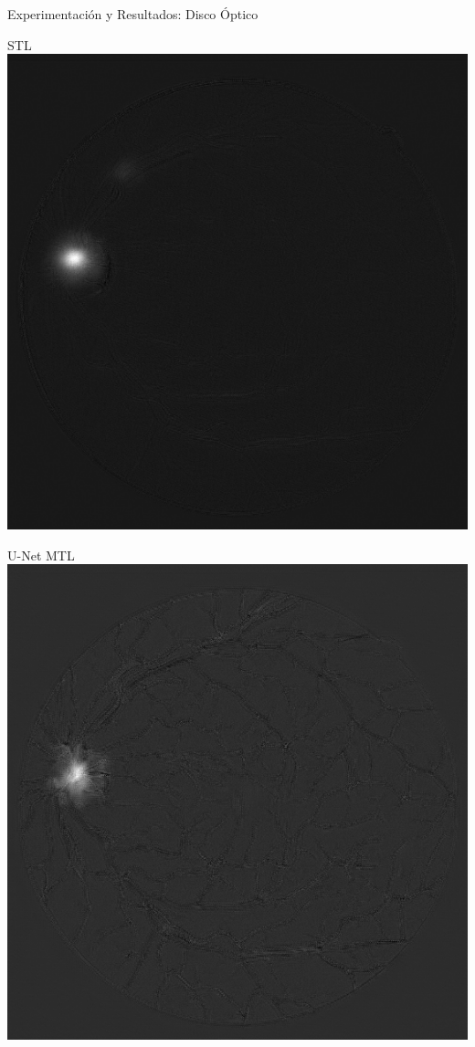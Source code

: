 \documentclass[xcolor=dvipsnames,table]{beamer}
\begin{document}
\begin{frame}{Experimentación y Resultados: Disco Óptico}
	\centering
	\begin{minipage}[b]{0.13\textwidth}
		\centering
		STL\\[0.2cm]
		\includegraphics[width=\linewidth]{my_images/video/ODSTL.jpg}
	\end{minipage}\hfill
	\begin{minipage}[b]{0.13\textwidth}
		\centering
		U-Net MTL\\[0.2cm]
		\includegraphics[width=\linewidth]{my_images/video/ODUNETMTL.jpg}

\end{minipage}
\end{frame}
\end{document}
